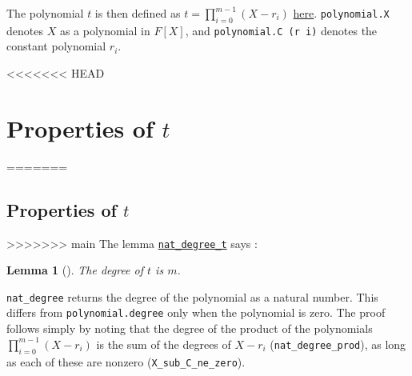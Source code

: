 \documentclass{article}
\newtheorem{lemma}{Lemma}
\theoremstyle{definition}
\theoremstyle{remark}
\begin{document}
The polynomial $t$ is then defined as $t = \prod_{i = 0}^{m - 1} (X - r_i)$ \href{https://github.com/BoltonBailey/formal-snarks-project/blob/7fd9cd122f5887f88f6a706b4f2a68a7153c7381/src/snarks/babysnark/knowledge_soundness.lean#L66}{here}. 
\texttt{polynomial.X} denotes $X$ as a polynomial in $F[X]$, and \texttt{polynomial.C (r i)} denotes the constant polynomial $r_i$.

<<<<<<< HEAD
\section{Properties of $t$}
=======
\subsection{Properties of $t$}
>>>>>>> main
The lemma \href{https://github.com/BoltonBailey/formal-snarks-project/blob/7fd9cd122f5887f88f6a706b4f2a68a7153c7381/src/snarks/babysnark/knowledge_soundness.lean#L71}{\texttt{nat\_degree\_t}} says : 
\theoremstyle{Lemma}
\begin{lemma}[]
  The degree of $t$ is $m$.  
\end{lemma}

\texttt{nat\_degree} returns the degree of the polynomial as a natural number. This differs from \texttt{polynomial.degree} only when the polynomial is zero. 
The proof follows simply by noting that the degree of the product of the polynomials $\prod_{i = 0}^{m - 1} (X - r_i)$ is the sum of the degrees of $X - r_i$ (\texttt{nat\_degree\_prod}), as long as each of these are nonzero (\texttt{X\_sub\_C\_ne\_zero}).
\end{document}
